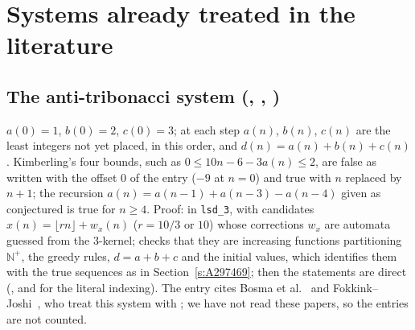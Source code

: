\section{Systems already treated in the literature}\label{s:prior}
\subsection{The anti-tribonacci system (, , )}
$a(0)=1$, $b(0)=2$, $c(0)=3$; at each step $a(n)$, $b(n)$, $c(n)$ are the least integers not yet placed, in this
order, and $d(n)=a(n)+b(n)+c(n)$. Kimberling's four bounds, such as $0\le10n-6-3a(n)\le2$, are false as written with
the offset $0$ of the entry ($-9$ at $n=0$) and true with $n$ replaced by $n+1$; the recursion
$a(n)=a(n-1)+a(n-3)-a(n-4)$ given as conjectured is true for $n\ge4$. Proof: \Walnut{} in \texttt{lsd\_3}, with
candidates $x(n)=\lfloor rn\rfloor+w_x(n)$ ($r=10/3$ or $10$) whose corrections $w_x$ are automata guessed from the
$3$-kernel; \Walnut{} checks that they are increasing functions partitioning $\mathbb{N}^+$, the greedy rules,
$d=a+b+c$ and the initial values, which identifies them with the true sequences as in
Section~\ref{s:A297469}; then the statements are direct (\TRUE, and \FALSE{} for the literal indexing). The
entry cites Bosma et al.~\cite{Bos} and Fokkink--Joshi~\cite{FJ2}, who treat this system with \Walnut; we have not
read these papers, so the entries are not counted.

